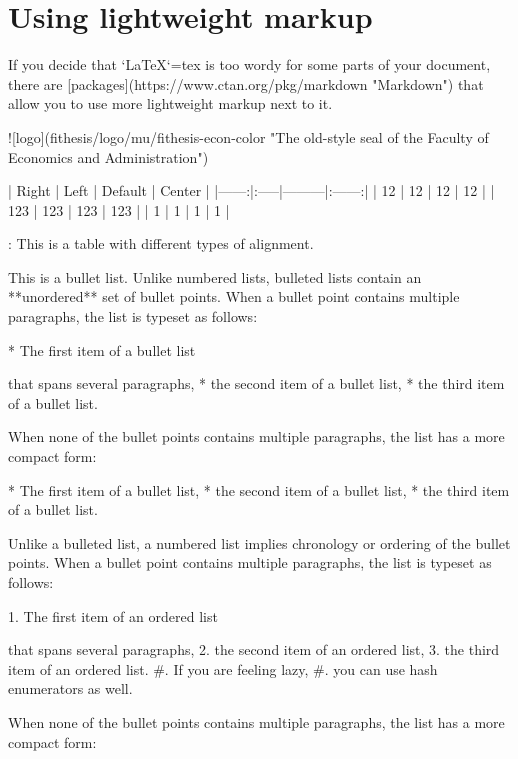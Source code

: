 \documentclass[
  digital,     %
  twoside,     %
  lof,         %
  lot,         %
]{fithesis4}
\begin{document}
\chapter{Using lightweight markup}
\shorthandoff{-}
\begin{markdown}

If you decide that `\LaTeX`{=tex} is too wordy for some parts of your
document, there are [packages](https://www.ctan.org/pkg/markdown
"Markdown") that allow you to use more lightweight markup next
to it.

 ![logo](fithesis/logo/mu/fithesis-econ-color "The old-style seal
         of the Faculty of Economics and Administration")

| Right | Left | Default | Center |
|------:|:-----|---------|:------:|
|    12 | 12   | 12      |   12   |
|   123 | 123  | 123     |   123  |
|     1 | 1    | 1       |    1   |

: This is a table with different types of alignment.

This is a bullet list. Unlike numbered lists, bulleted lists
contain an **unordered** set of bullet points. When a bullet point
contains multiple paragraphs, the list is typeset as follows:

  * The first item of a bullet list

    that spans several paragraphs,
  * the second item of a bullet list,
  * the third item of a bullet list.

When none of the bullet points contains multiple paragraphs, the
list has a more compact form:

  * The first item of a bullet list,
  * the second item of a bullet list,
  * the third item of a bullet list.

Unlike a bulleted list, a numbered list implies chronology or
ordering of the bullet points. When a bullet point
contains multiple paragraphs, the list is typeset as follows:

  1. The first item of an ordered list

     that spans several paragraphs,
  2. the second item of an ordered list,
  3. the third item of an ordered list.
  #. If you are feeling lazy,
  #. you can use hash enumerators as well.

When none of the bullet points contains multiple paragraphs, the
list has a more compact form:


\end{markdown}
\end{document}
